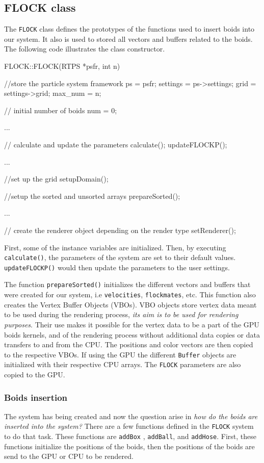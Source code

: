 \subsection{FLOCK class}
The \texttt{FLOCK} class defines the prototypes of the functions used to insert boids into our system. It also is used to stored all vectors and buffers related to the boids. The following code illustrates the class constructor. 

\begin{cppcode}{0}
FLOCK::FLOCK(RTPS *psfr, int n)
 {
 	//store the particle system framework
 	ps = psfr;
	settings = ps->settings;
	grid = settings->grid;
	max_num = n;
	
	// initial number of boids
	num = 0;
 	
	...
 
 	// calculate and update the parameters
	calculate();
	updateFLOCKP();

	...

	//set up the grid
	setupDomain();
	
	//setup the sorted and unsorted arrays
	prepareSorted();
 	 
	 ...
		
	// create the renderer object depending on the render type		
	setRenderer(); 
}
\end{cppcode}

First, some of the instance variables are initialized. Then, by executing \texttt{calculate()}, the parameters of the system are set to their default values. \texttt{updateFLOCKP()} would then update the parameters to the user settings.

The function \texttt{prepareSorted()} initializes the different vectors and buffers that were created for our system, i.e \texttt{velocities}, \texttt{flockmates}, etc. This function also creates the Vertex Buffer Objects (VBOs). VBO objects store vertex data meant to be used during the rendering process, {\em its aim is to be used for rendering purposes}\cite{vbo}. Their use makes it possible for the vertex data to be a part of the GPU boids kernels, and of the rendering process without additional data copies or data transfers to and from the CPU. The positions and color vectors are then copied to the respective VBOs. If using the GPU the different \texttt{Buffer} objects are initialized with their respective CPU arrays. The \texttt{FLOCK} parameters are also copied to the GPU. 

\subsubsection{Boids insertion}
The system has being created and now the question arise in \textit{how do the boids are inserted into the system?} There are a few functions defined in the \texttt{FLOCK} system to do that task. These functions are \texttt{addBox} , \texttt{addBall}, and \texttt{addHose}. First, these functions initialize the positions of the boids, then the positions of the boids are send to the GPU or CPU to be rendered. 

